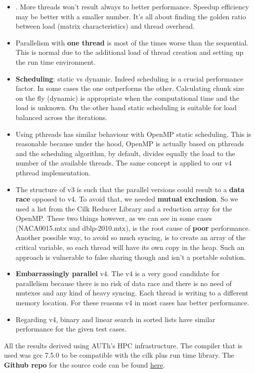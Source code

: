 \documentclass[12pt, a4paper]{article}
\begin{document}
\begin{itemize}
    \item {}. More threads won't result always to better performance. Speedup efficiency may be better with a smaller number. It's all about finding the golden ratio between load (matrix characteristics) and thread overhead.
    \item Parallelism with \textbf{one thread} is most of the times worse than the sequential. This is normal due to the additional load of thread creation and setting up the run time environment.
    \item \textbf{Scheduling}: static vs dynamic. Indeed scheduling is a crucial performance factor. In some cases the one outperforms the other. Calculating chunk size on the fly (dynamic) is appropriate when the computational time and the load is unknown. On the other hand static scheduling is suitable for load balanced across the iterations.
    \item Using pthreads has similar behaviour with OpenMP static scheduling. This is reasonable because under the hood, OpenMP is actually based on pthreads and the scheduling algorithm, by default, divides equally the load to the number of the available threads. The same concept is applied to our v4 pthread implementation.
    \item The structure of v3 is such that the parallel versions could result to a \textbf{data race} opposed to v4. To avoid that, we needed \textbf{mutual exclusion}. So we used a list from the Cilk Reducer Library and a reduction array for the OpenMP. These two things however, as we can see in some cases (NACA0015.mtx and dblp-2010.mtx), is the root cause of \textbf{poor} performance. Another possible way, to avoid so much syncing, is to create an array of the critical variable, so each thread will have its own copy in the heap. Such an approach is vulnerable to false sharing though and isn't a portable solution.
    \item \textbf{Embarrassingly parallel} v4. The v4 is a very good candidate for parallelism because there is no risk of data race and there is no need of mutexes and any kind of heavy syncing. Each thread is writing to a different memory location. For these reasons v4 in most cases has better performance.
    \item Regarding v4, binary and linear search in sorted lists have similar performance for the given test cases.
\end{itemize}

\vspace{1cm}

All the results derived using AUTh's HPC infrastructure. The compiler that is used was gcc 7.5.0 to be compatible with the cilk plus run time library. The \textbf{Github repo} for the source code can be found \href{https://github.com/thodkatz/ece-triangle-counting}{here}.
\end{document}

